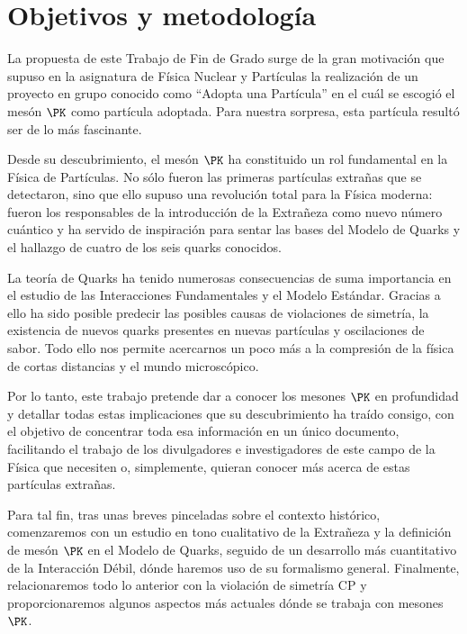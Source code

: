 \chapter*{Objetivos y metodología}
\label{cap:objetivos}

La propuesta de este Trabajo de Fin de Grado surge de la gran motivación que supuso en la asignatura de Física Nuclear y Partículas la realización de un proyecto en grupo conocido como ``Adopta una Partícula'' en el cuál se escogió el mesón $\PK$ como partícula adoptada. Para nuestra sorpresa, esta partícula resultó ser de lo más fascinante.

Desde su descubrimiento, el mesón $\PK$ ha constituido un rol fundamental en la Física de Partículas. No sólo fueron las primeras partículas extrañas que se detectaron, sino que ello supuso una revolución total para la Física moderna: fueron los responsables de la introducción de la Extrañeza como nuevo número cuántico y ha servido de inspiración para sentar las bases del Modelo de Quarks y el hallazgo de cuatro de los seis quarks conocidos.

La teoría de Quarks ha tenido numerosas consecuencias de suma importancia en el estudio de las Interacciones Fundamentales y el Modelo Estándar. Gracias a ello ha sido posible predecir las posibles causas de violaciones de simetría, la existencia de nuevos quarks presentes en nuevas partículas y oscilaciones de sabor. Todo ello nos permite acercarnos un poco más a la compresión de la física de cortas distancias y el mundo microscópico. 

Por lo tanto, este trabajo pretende dar a conocer los mesones $\PK$ en profundidad y detallar todas estas implicaciones que su descubrimiento ha traído consigo, con el objetivo de concentrar toda esa información en un único documento, facilitando el trabajo de los divulgadores e investigadores de este campo de la Física que necesiten o, simplemente, quieran conocer más acerca de estas partículas extrañas. %

Para tal fin, tras unas breves pinceladas sobre el contexto histórico, comenzaremos con un estudio en tono cualitativo de la Extrañeza y la definición de mesón $\PK$ en el Modelo de Quarks, seguido de un desarrollo más cuantitativo de la Interacción Débil, dónde haremos uso de su formalismo general. Finalmente, relacionaremos todo lo anterior con la violación de simetría CP y proporcionaremos algunos aspectos más actuales dónde se trabaja con mesones $\PK$.



